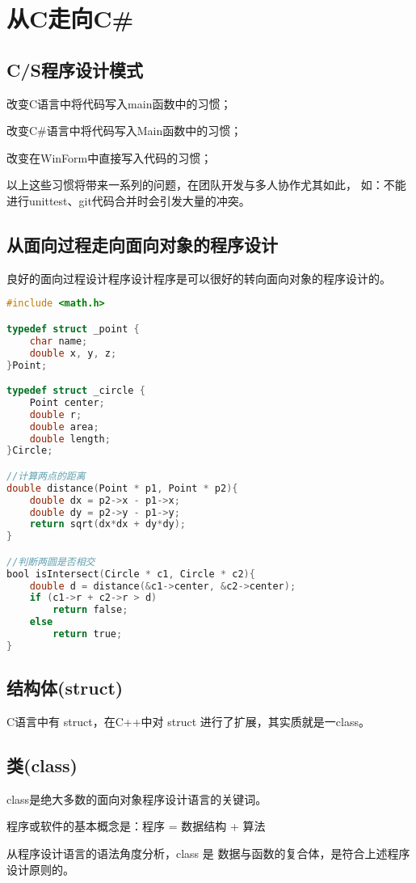 ﻿%

\chapter{从C走向C\#}

\section{C/S程序设计模式}
改变C语言中将代码写入main函数中的习惯；

改变C\#语言中将代码写入Main函数中的习惯；

改变在WinForm中直接写入代码的习惯；

以上这些习惯将带来一系列的问题，在团队开发与多人协作尤其如此，
如：不能进行unittest、git代码合并时会引发大量的冲突。

\section{从面向过程走向面向对象的程序设计 }

良好的面向过程设计程序设计程序是可以很好的转向面向对象的程序设计的。

 
\begin{lstlisting}[language=C]
#include <math.h>

typedef struct _point {
    char name;
    double x, y, z;
}Point;

typedef struct _circle {
    Point center;
    double r;
    double area;
    double length;
}Circle;

//计算两点的距离
double distance(Point * p1, Point * p2){
    double dx = p2->x - p1->x;
    double dy = p2->y - p1->y;
    return sqrt(dx*dx + dy*dy);
}

//判断两圆是否相交
bool isIntersect(Circle * c1, Circle * c2){
    double d = distance(&c1->center, &c2->center);
    if (c1->r + c2->r > d)
        return false;
    else
        return true;
}

\end{lstlisting}

% 
% 
% 

\section{ 结构体(struct) }

C语言中有 struct，在C++中对 struct 进行了扩展，其实质就是一class。

\section{ 类(class) }

class是绝大多数的面向对象程序设计语言的关键词。

程序或软件的基本概念是：程序 = 数据结构 + 算法

从程序设计语言的语法角度分析，class 是 数据与函数的复合体，是符合上述程序设计原则的。
